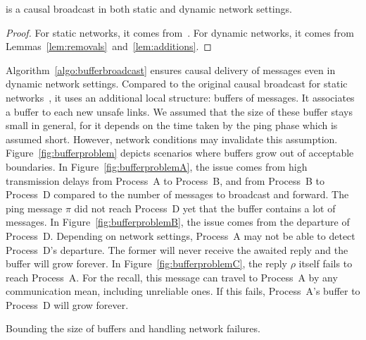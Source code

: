 \begin{theorem}
  \CBROADCAST is a causal broadcast in both static and dynamic network settings.
\end{theorem}

\begin{proof}
  For static networks, it comes from~\cite{friedman2004causal}. For dynamic
  networks, it comes from Lemmas~\ref{lem:removals}~and~\ref{lem:additions}.
\end{proof}

Algorithm~\ref{algo:bufferbroadcast} ensures causal delivery of messages even in
dynamic network settings. Compared to the original causal broadcast for static
networks~\cite{friedman2004causal}, it uses an additional local structure:
buffers of messages. It associates a buffer to each new unsafe links. We assumed
that the size of these buffer stays small in general, for it depends on the time
taken by the ping phase which is assumed short. However, network conditions may
invalidate this assumption. Figure~\ref{fig:bufferproblem} depicts scenarios
where buffers grow out of acceptable boundaries. In
Figure~\ref{fig:bufferproblemA}, the issue comes from high transmission delays
from Process~A to Process~B, and from Process~B to Process~D compared to the
number of messages to broadcast and forward. The ping message $\pi$ did not
reach Process~D yet that the buffer contains a lot of messages. In
Figure~\ref{fig:bufferproblemB}, the issue comes from the departure of
Process~D. Depending on network settings, Process~A may not be able to detect
Process~D's departure. The former will never receive the awaited reply and the
buffer will grow forever. In Figure~\ref{fig:bufferproblemC}, the reply $\rho$
itself fails to reach Process~A. For the recall, this message can travel to
Process~A by any communication mean, including unreliable ones. If this fails,
Process~A's buffer to Process~D will grow
forever. %

\begin{algorithm}
  
  \caption{\label{algo:boundingbuffer}Bounding the size of buffers and handling
    network failures.}
\end{algorithm}

